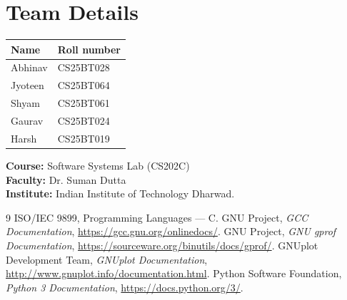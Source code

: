 \documentclass[12pt,a4paper,oneside]{report}
\begin{document}
\chapter{Team Details}
\begin{table}[H]\centering\begin{tabular}{ll}\toprule Name & Roll number\\\midrule Abhinav & CS25BT028\\ Jyoteen & CS25BT064\\ Shyam & CS25BT061\\ Gaurav & CS25BT024\\ Harsh & CS25BT019\\\bottomrule\end{tabular}\end{table}
\textbf{Course:} Software Systems Lab (CS202C)\\\textbf{Faculty:} Dr. Suman Dutta\\\textbf{Institute:} Indian Institute of Technology Dharwad.
\begin{thebibliography}{9}
 ISO/IEC 9899, Programming Languages --- C.
 GNU Project, \emph{GCC Documentation}, \url{https://gcc.gnu.org/onlinedocs/}.
 GNU Project, \emph{GNU gprof Documentation}, \url{https://sourceware.org/binutils/docs/gprof/}.
 GNUplot Development Team, \emph{GNUplot Documentation}, \url{http://www.gnuplot.info/documentation.html}.
 Python Software Foundation, \emph{Python 3 Documentation}, \url{https://docs.python.org/3/}.
\end{thebibliography}
\end{document}

